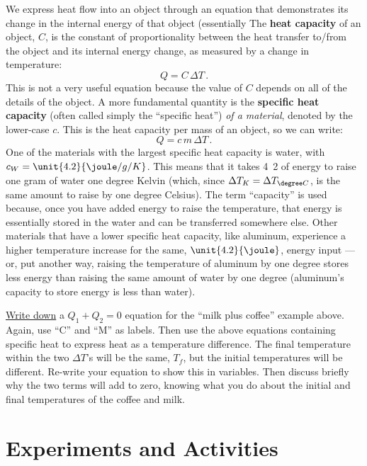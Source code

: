 \answerspace[2.5cm]

We express heat flow into an object through an equation that demonstrates its change in the internal energy of that object (essentially The {\bf heat capacity} of an object, $C$,  is the constant of proportionality between the heat transfer to/from the object and its internal energy change, as measured by a change in temperature:
	\begin{equation*}
	Q = C \, \Delta T \, .
	\end{equation*}
This is not a very useful equation because the value of $C$ depends on all of the details of the object.  A more fundamental quantity is the {\bf specific heat capacity} (often called simply the ``specific heat'') {\em of a material}, denoted by the lower-case $c$.  This is the heat capacity per mass of an object, so we can write:
	\begin{equation*}
	Q = c \, m \, \Delta T \, .
	\end{equation*}
One of the materials with the largest specific heat capacity is water, with $c_W = \unit{4.2}{ \joule/g/K}$.  This means that it takes \unit{4.2}{\joule} of energy to raise one gram of water one degree Kelvin (which, since $\Delta T_K = \Delta T_{\degree C}$, is the same amount to raise by one degree Celsius). The term ``capacity'' is used because, once you have added energy to raise the temperature, that energy is essentially stored in the water and can be transferred somewhere else.  Other materials that have a lower specific heat capacity, like aluminum,  experience a higher temperature increase for the same, $\unit{4.2}{\joule}$, energy input --- or, put another way, raising the temperature of aluminum by one degree stores less energy than raising the same amount of water by one degree (aluminum's capacity to store energy is less than water).

\underline{Write down} a $Q_1 + Q_2 = 0$ equation for the ``milk plus coffee'' example above. Again, use ``C'' and ``M'' as labels. Then use the above equations containing specific heat to express heat as a temperature difference.  The final temperature within the two $\Delta T$'s will be the same, $T_f$, but the initial temperatures will be different.  Re-write your equation to show this in variables.  Then discuss briefly why the two terms will add to zero, knowing what you do about the initial and final temperatures of the coffee and milk.

\newpage

\section{Experiments and Activities}


